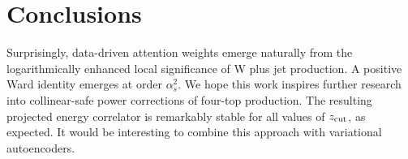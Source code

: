 \section{Conclusions}\label{sec:conclusions}

Surprisingly, data-driven attention weights emerge naturally from the
logarithmically enhanced local significance of W plus jet production. A
positive Ward identity emerges at order $\alpha_s^2$. We hope this work
inspires further research into collinear-safe power corrections of
four-top production. The resulting projected energy correlator is
remarkably stable for all values of $z_{\rm cut}$, as expected. It would
be interesting to combine this approach with variational autoencoders.

